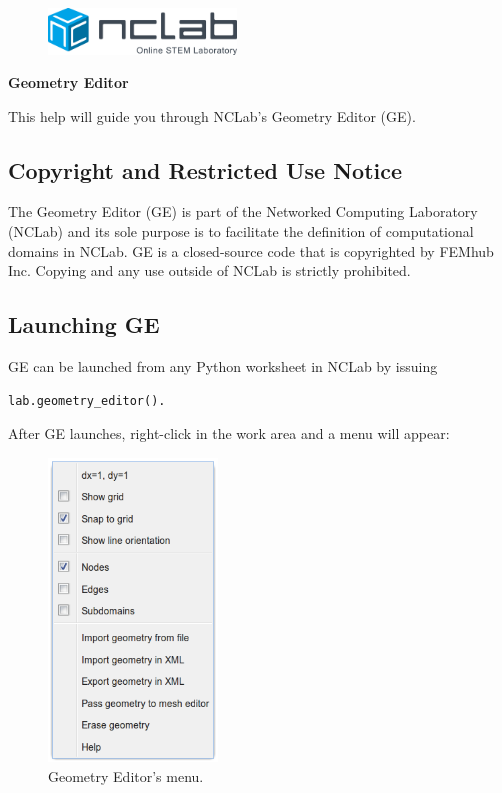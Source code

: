 \documentclass{article}
\begin{document}
\large

\vbox{}
\begin{figure}[!ht]
\includegraphics[width=5cm]{logo.png}
\vspace{4mm}
\end{figure}

\centerline{\huge \bf Geometry Editor}
\vspace{6mm}
\noindent
This help will guide you through NCLab's Geometry Editor (GE).

\subsection*{Copyright and Restricted Use Notice}

The Geometry Editor (GE) is part of the Networked Computing Laboratory (NCLab) and its sole purpose is to facilitate the definition of computational domains in NCLab. GE is a closed-source code that is copyrighted by FEMhub Inc. Copying and any use outside of NCLab is strictly prohibited.

\subsection*{Launching GE}

GE can be launched from any Python worksheet in NCLab by issuing 

\begin{verbatim}
lab.geometry_editor().
\end{verbatim}
After GE launches, right-click in the work area and a menu will appear:\\

\begin{figure}[!ht]
\begin{center}
\includegraphics[width=4.5cm]{ge-menu.png}
\end{center}
\vspace{-4mm}
\caption{Geometry Editor's menu.}
\end{figure}
\end{document}
